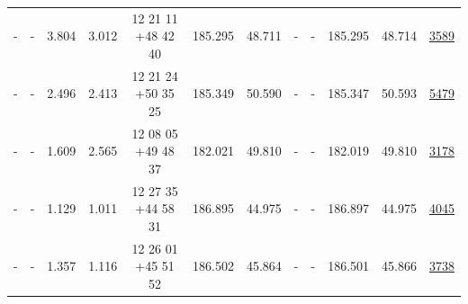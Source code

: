 \documentclass{article}
\begin{document}
\begin{landscape}
\begin{longtable}{c|c|c|c|c|c|c|c|c|c|c|c}
- & - & 3.804 & 3.012 & 12 21 11 +48 42 40 &  185.295 & 48.711 &  - & - & 185.295 & 48.714 & \href{http://banana.transientskp.org/r4/vlo_KmeulenSimSource/runningcatalog/3589}{3589}  \\
- & - & 2.496 & 2.413 & 12 21 24 +50 35 25 &  185.349 & 50.590 &  - & - & 185.347 & 50.593 & \href{http://banana.transientskp.org/r4/vlo_KmeulenSimSource/runningcatalog/5479}{5479}  \\
- & - & 1.609 & 2.565 & 12 08 05 +49 48 37 &  182.021 & 49.810 &  - & - & 182.019 & 49.810 & \href{http://banana.transientskp.org/r4/vlo_KmeulenSimSource/runningcatalog/3178}{3178}  \\
- & - & 1.129 & 1.011 & 12 27 35 +44 58 31 &  186.895 & 44.975 &  - & - & 186.897 & 44.975 & \href{http://banana.transientskp.org/r4/vlo_KmeulenSimSource/runningcatalog/4045}{4045}  \\
- & - & 1.357 & 1.116 & 12 26 01 +45 51 52 &  186.502 & 45.864 &  - & - & 186.501 & 45.866 & \href{http://banana.transientskp.org/r4/vlo_KmeulenSimSource/runningcatalog/3738}{3738}  \\
\end{longtable}

\end{landscape}
\end{document}
